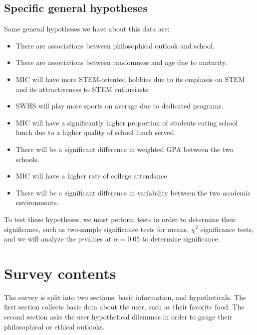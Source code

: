 \documentclass[12pt, letterpaper]{article}
\begin{document}
\subsection{Specific general hypotheses}
Some general hypotheses we have about this data are: 
\begin{itemize}
    \item There are associations between philosophical outlook and school.
    \item There are associations between randomness and age due to maturity.
    \item MIC will have more STEM-oriented hobbies due to its emphasis on STEM and its attractiveness to STEM enthusiasts.
    \item SWHS will play more sports on average due to dedicated programs.
    \item MIC will have a significantly higher proportion of students eating school lunch due to a higher quality of school lunch served.
    \item There will be a significant difference in weighted GPA between the two schools.
    \item MIC will have a higher rate of college attendance.
    \item There will be a significant difference in variability between the two academic environments.
\end{itemize}
To test these hypotheses, we must perform tests in order to determine their significance, such as two-sample significance tests for means, $\chi^2$ significance tests, and we will analyze the p-values at $\alpha=0.05$ to determine significance.

\section{Survey contents}
The survey is split into two sections: basic information, and hypotheticals. The first section collects basic data about the user, such as their favorite food. The second section asks the user hypothetical dilemmas in order to gauge their philosophical or ethical outlooks.
\end{document}

